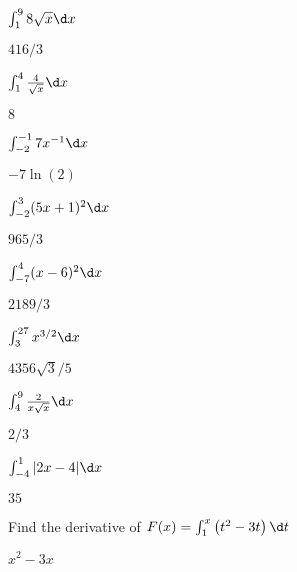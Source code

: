 \begin{exercises}
\begin{exercise} $\int_1^9 8\sqrt{x}\d x$
\begin{answer} $416/3$
\end{answer}\end{exercise}

\begin{exercise} $\int_1^4 \frac{4}{\sqrt{x}}\d x$
\begin{answer} $8$
\end{answer}\end{exercise}


\begin{exercise} $\int_{-2}^{-1}7x^{-1}\d x$
\begin{answer} $-7\ln(2)$
\end{answer}\end{exercise}


\begin{exercise} $\int_{-2}^3 (5x+1)^2\d x$
\begin{answer} $965/3$
\end{answer}\end{exercise}

\begin{exercise} $\int_{-7}^4(x-6)^2 \d x$
\begin{answer} $2189/3$
\end{answer}\end{exercise}

\begin{exercise} $\int_3^{27}x^{3/2}\d x$
\begin{answer} $4356 \sqrt{3}/5$
\end{answer}\end{exercise}

\begin{exercise} $\int_4^9\frac{2}{x\sqrt x}\d x$
\begin{answer} $2/3$
\end{answer}\end{exercise}

\begin{exercise} $\int_{-4}^1|2x-4|\d x$
\begin{answer} $35$
\end{answer}\end{exercise}

\endtwocol

\begin{exercise} Find the derivative of $F(x)=\int_1^x \left(t^2-3t\right)\d t$
\begin{answer} $x^2-3x$
\end{answer}\end{exercise}


\end{exercises}
